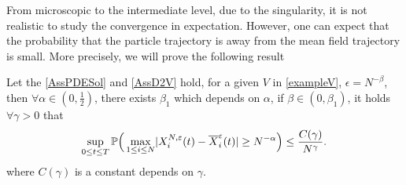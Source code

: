 \vskip5mm
From microscopic to the intermediate level, due to the singularity, it is not realistic to study the convergence in expectation. However, one can expect that the probability that the particle trajectory is away from the mean field  trajectory is small. More precisely, we will prove the following result


\begin{theorem}
Let the \autoref{AssPDESol} and \autoref{AssD2V} hold, for a given $V$ in \autoref{exampleV},
$\epsilon = N^{-\beta }$, then $\forall \alpha \in (0,\frac12)$, there exists $\beta_1$ which depends on $\alpha$, if $ \beta  \in  (0,\beta_1) $, it holds $\forall  \gamma  > 0$ that
 \begin{align*}
  \sup_{0\leq t\leq T}\mathbb{P}\Big(  \max_{1\leq i\leq N} \lvert X^{N,\varepsilon}_i(t) - \overline{X}_i^{\varepsilon}(t)   \rvert \ge N^{-\alpha } \Big) \le \frac{C(\gamma )}{N^{\gamma } } 
 .\end{align*}
 where $C(\gamma)$ is a constant depends on $\gamma$.
\end{theorem}
